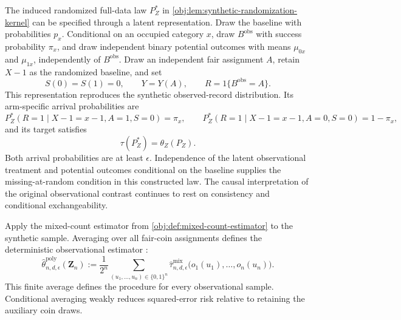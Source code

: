 \documentclass[11pt]{article}
\begin{document}
The induced randomized full-data law \(P_Z^*\) in \cref{obj:lem:synthetic-randomization-kernel} can be specified through a latent representation. Draw the baseline with probabilities \(p_x\). Conditional on an occupied category \(x\), draw \(B^{\mathrm{obs}}\) with success probability \(\pi_x\), and draw independent binary potential outcomes with means \(\mu_{0x}\) and \(\mu_{1x}\), independently of \(B^{\mathrm{obs}}\). Draw an independent fair assignment \(A\), retain \(X-1\) as the randomized baseline, and set
\[
S(0)=S(1)=0,\qquad
Y=Y(A),\qquad
R=1\{B^{\mathrm{obs}}=A\}.
\]
This representation reproduces the synthetic observed-record distribution. Its arm-specific arrival probabilities are
\[
P_Z^*(R=1\mid X-1=x-1,A=1,S=0)=\pi_x,
\qquad
P_Z^*(R=1\mid X-1=x-1,A=0,S=0)=1-\pi_x,
\]
and its target satisfies
\[
\tau(P_Z^*)=\theta_Z(P_Z).
\]
Both arrival probabilities are at least \(\epsilon\). Independence of the latent observational treatment and potential outcomes conditional on the baseline supplies the missing-at-random condition in this constructed law. The causal interpretation of the original observational contrast continues to rest on consistency and conditional exchangeability.

Apply the mixed-count estimator
from \cref{obj:def:mixed-count-estimator} to the synthetic sample. Averaging over all fair-coin assignments defines the deterministic observational estimator
:
\[
\widehat\theta^{\mathrm{poly}}_{n,d,\epsilon}(\mathbf Z_n)
:=
\frac{1}{2^n}
\sum_{(u_1,\ldots,u_n)\in\{0,1\}^n}
\widehat\tau^{\mathrm{mix}}_{n,d,\epsilon}
\bigl(o_1(u_1),\ldots,o_n(u_n)\bigr).
\]
This finite average defines the procedure for every observational sample. Conditional averaging weakly reduces squared-error risk relative to retaining the auxiliary coin draws.
\end{document}
